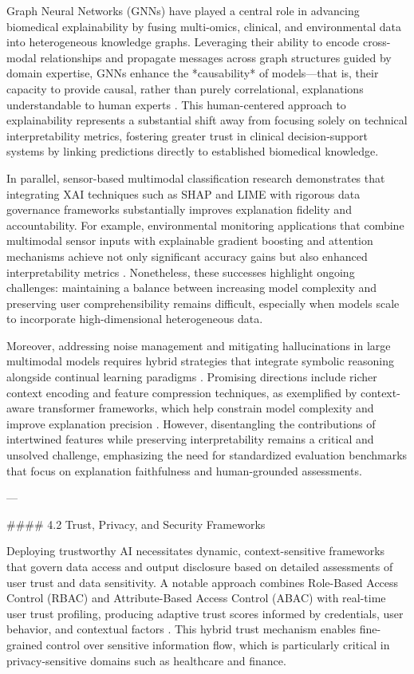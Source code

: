 \documentclass[11pt]{article}
\begin{document}
Graph Neural Networks (GNNs) have played a central role in advancing biomedical explainability by fusing multi-omics, clinical, and environmental data into heterogeneous knowledge graphs. Leveraging their ability to encode cross-modal relationships and propagate messages across graph structures guided by domain expertise, GNNs enhance the *causability* of models—that is, their capacity to provide causal, rather than purely correlational, explanations understandable to human experts \cite{ref24}. This human-centered approach to explainability represents a substantial shift away from focusing solely on technical interpretability metrics, fostering greater trust in clinical decision-support systems by linking predictions directly to established biomedical knowledge.

In parallel, sensor-based multimodal classification research demonstrates that integrating XAI techniques such as SHAP and LIME with rigorous data governance frameworks substantially improves explanation fidelity and accountability. For example, environmental monitoring applications that combine multimodal sensor inputs with explainable gradient boosting and attention mechanisms achieve not only significant accuracy gains but also enhanced interpretability metrics \cite{ref25}. Nonetheless, these successes highlight ongoing challenges: maintaining a balance between increasing model complexity and preserving user comprehensibility remains difficult, especially when models scale to incorporate high-dimensional heterogeneous data.

Moreover, addressing noise management and mitigating hallucinations in large multimodal models requires hybrid strategies that integrate symbolic reasoning alongside continual learning paradigms \cite{ref13,ref24,ref25}. Promising directions include richer context encoding and feature compression techniques, as exemplified by context-aware transformer frameworks, which help constrain model complexity and improve explanation precision \cite{ref17}. However, disentangling the contributions of intertwined features while preserving interpretability remains a critical and unsolved challenge, emphasizing the need for standardized evaluation benchmarks that focus on explanation faithfulness and human-grounded assessments.

---

#### 4.2 Trust, Privacy, and Security Frameworks

Deploying trustworthy AI necessitates dynamic, context-sensitive frameworks that govern data access and output disclosure based on detailed assessments of user trust and data sensitivity. A notable approach combines Role-Based Access Control (RBAC) and Attribute-Based Access Control (ABAC) with real-time user trust profiling, producing adaptive trust scores informed by credentials, user behavior, and contextual factors \cite{ref11}. This hybrid trust mechanism enables fine-grained control over sensitive information flow, which is particularly critical in privacy-sensitive domains such as healthcare and finance.
\end{document}
